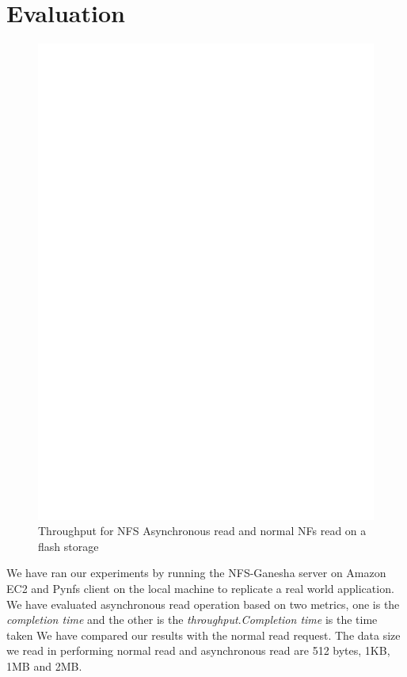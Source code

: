 \section{Evaluation}
\label{sec:Evaluation}

\begin{figure}
\centering
\includegraphics[scale=0.6]{figures/performancesequence.eps}
\caption{Throughput for NFS Asynchronous read and normal NFs read on a flash storage}
\label{fig:performancesequence}
\end{figure}

	We have ran our experiments by running the NFS-Ganesha server on Amazon EC2 and Pynfs client on the local machine to replicate a real world application.  We have evaluated asynchronous read operation based on two metrics, one is the \textit{completion time} and the other is the \textit{throughput}.\textit{Completion time} is the time taken  We have compared our results with the normal read request. The data size we read in performing normal read and asynchronous read are 512 bytes, 1KB, 1MB and 2MB. 


